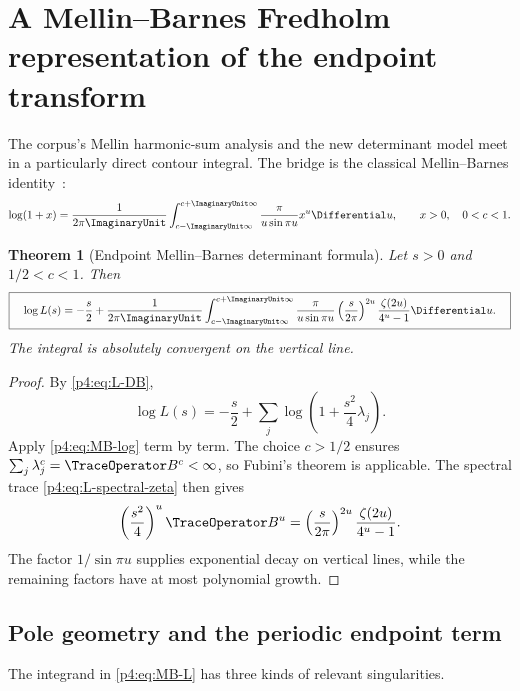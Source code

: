\documentclass[11pt]{article}
\newtheorem{theorem}{Theorem}[section]
\theoremstyle{definition}
\theoremstyle{remark}
\begin{document}
\section{A Mellin--Barnes Fredholm representation of the endpoint transform}
\label{p4:sec:MB}

The corpus's Mellin harmonic-sum analysis and the new determinant model meet in a
particularly direct contour integral.  The bridge is the classical Mellin--Barnes
identity~\cite{p4:FlajoletGourdonDumas1995}:
\begin{equation}
 \log(1+x)=\frac1{2\pi\ImaginaryUnit}
 \int_{c-\ImaginaryUnit\infty}^{c+\ImaginaryUnit\infty}
 \frac{\pi}{u\sin\pi u}x^u\Differential u,
 \qquad x>0,\quad0<c<1.
 \label{p4:eq:MB-log}
\end{equation}

\begin{theorem}[Endpoint Mellin--Barnes determinant formula]
\label{p4:thm:MB}
Let \(s>0\) and \(1/2<c<1\).  Then
\begin{equation}
 \boxed{\quad
 \log L(s)=-\frac s2+\frac1{2\pi\ImaginaryUnit}
 \int_{c-\ImaginaryUnit\infty}^{c+\ImaginaryUnit\infty}
 \frac{\pi}{u\sin\pi u}
 \left(\frac{s}{2\pi}\right)^{2u}
 \frac{\zeta(2u)}{4^u-1}\Differential u.
 \quad}
 \label{p4:eq:MB-L}
\end{equation}
The integral is absolutely convergent on the vertical line.
\end{theorem}

\begin{proof}
By \eqref{p4:eq:L-DB},
\[
 \log L(s)=-\frac s2+\sum_j\log\left(1+\frac{s^2}{4}\lambda_j\right).
\]
Apply \eqref{p4:eq:MB-log} term by term.  The choice \(c>1/2\) ensures
\(\sum_j\lambda_j^c=\TraceOperator B^c<\infty\), so Fubini's theorem is applicable.  The
spectral trace \eqref{p4:eq:L-spectral-zeta} then gives
\[
 \left(\frac{s^2}{4}\right)^u\TraceOperator B^u
 =\left(\frac{s}{2\pi}\right)^{2u}
 \frac{\zeta(2u)}{4^u-1}.
\]
The factor \(1/\sin\pi u\) supplies exponential decay on vertical lines, while the
remaining factors have at most polynomial growth.
\end{proof}

\subsection{Pole geometry and the periodic endpoint term}

The integrand in \eqref{p4:eq:MB-L} has three kinds of relevant singularities.
\end{document}
